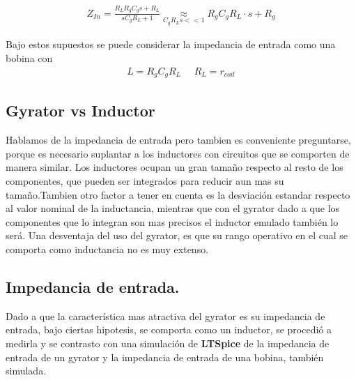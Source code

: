\begin{align}Z_{In}=\frac{R_LR_gC_gs+R_L}{sC_gR_L+1}\underset{C_gR_Ls << 1}{\approx}R_gC_gR_L \cdot s + R_g 
\label{eq:Zintrans}
\end{align}

Bajo estos supuestos se puede considerar la impedancia de entrada como una bobina con 
\begin{align}  L=R_gC_gR_L  \ \ \ \ \ \  R_L=r_{coil} \label{eq:basicL1}\end{align}
\flushleft
\subsection{Gyrator vs Inductor}
Hablamos de la impedancia de entrada pero tambien es conveniente preguntarse, porque es necesario suplantar a los inductores con circuitos que se comporten de manera similar.
Los inductores ocupan un gran tamaño respecto al resto de los componentes, que pueden ser integrados para reducir aun mas su tamaño.Tambien otro factor a tener en cuenta es la desviación estandar respecto al valor nominal de la inductancia, mientras que con el gyrator dado a que los componentes que lo integran son mas precisos el inductor emulado también lo será. Una desventaja del uso del gyrator, es que su rango operativo en el cual se comporta como inductancia no es muy extenso.

\subsection{Impedancia de entrada.}
\label{section:zin}
Dado a que la característica mas atractiva del gyrator es  su impedancia de entrada, bajo ciertas hipotesis, se comporta como un inductor, se procedió a medirla y se contrasto con una simulación de \textbf{LTSpice} de la impedancia de entrada de un gyrator y la impedancia de entrada de una bobina, también simulada.

